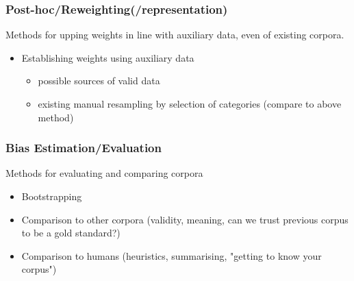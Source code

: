 \subsubsection{Post-hoc/Reweighting(/representation)}
Methods for upping weights in line with auxiliary data, even of existing corpora.

\begin{itemize}
 \item Establishing weights using auxiliary data
    \begin{itemize}
    \item possible sources of valid data
    \item existing manual resampling by selection of categories (compare to above method)
    \end{itemize}
\end{itemize}


\subsubsection{Bias Estimation/Evaluation}
Methods for evaluating and comparing corpora

\begin{itemize}
 \item Bootstrapping
 \item Comparison to other corpora (validity, meaning, can we trust previous corpus to be a gold standard?)
 \item Comparison to humans (heuristics, summarising, "getting to know your corpus")
\end{itemize}




















